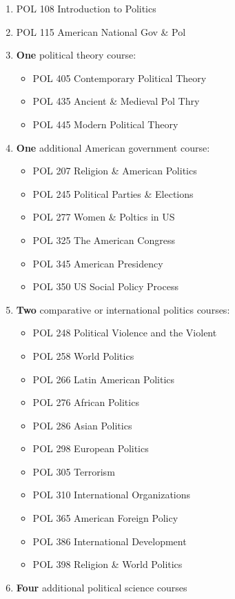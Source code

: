 \documentclass[
  letterpaper,
]{scrbook}
\providecommand{\tightlist}{%
  \setlength{\itemsep}{0pt}\setlength{\parskip}{0pt}}
\begin{document}
\begin{enumerate}
\def\labelenumi{\arabic{enumi}.}
\item
  POL 108 Introduction to Politics
\item
  POL 115 American National Gov \& Pol
\item
  \textbf{One} political theory course:

  \begin{itemize}
  \tightlist
  \item
    POL 405 Contemporary Political Theory
  \item
    POL 435 Ancient \& Medieval Pol Thry
  \item
    POL 445 Modern Political Theory
  \end{itemize}
\item
  \textbf{One} additional American government course:

  \begin{itemize}
  \tightlist
  \item
    POL 207 Religion \& American Politics
  \item
    POL 245 Political Parties \& Elections
  \item
    POL 277 Women \& Poltics in US
  \item
    POL 325 The American Congress
  \item
    POL 345 American Presidency
  \item
    POL 350 US Social Policy Process
  \end{itemize}
\item
  \textbf{Two} comparative or international politics courses:

  \begin{itemize}
  \tightlist
  \item
    POL 248 Political Violence and the Violent
  \item
    POL 258 World Politics
  \item
    POL 266 Latin American Politics
  \item
    POL 276 African Politics
  \item
    POL 286 Asian Politics
  \item
    POL 298 European Politics
  \item
    POL 305 Terrorism
  \item
    POL 310 International Organizations\\
  \item
    POL 365 American Foreign Policy
  \item
    POL 386 International Development
  \item
    POL 398 Religion \& World Politics
  \end{itemize}
\item
  \textbf{Four} additional political science courses
\end{enumerate}
\end{document}
